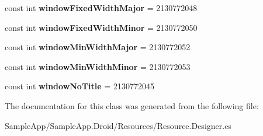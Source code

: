 \begin{DoxyCompactItemize}
const int {\bfseries window\+Fixed\+Width\+Major} = 2130772048
\item 
\mbox{\label{class_sample_app_1_1_droid_1_1_resource_1_1_attribute_adc149fd12f0a806c3bf35e2e3eb2c560}} 
const int {\bfseries window\+Fixed\+Width\+Minor} = 2130772050
\item 
\mbox{\label{class_sample_app_1_1_droid_1_1_resource_1_1_attribute_a8f9f90a1838adae18254a3d6462bdeb4}} 
const int {\bfseries window\+Min\+Width\+Major} = 2130772052
\item 
\mbox{\label{class_sample_app_1_1_droid_1_1_resource_1_1_attribute_a5f1db03cef2a5217f6031d0ef1b93bf9}} 
const int {\bfseries window\+Min\+Width\+Minor} = 2130772053
\item 
\mbox{\label{class_sample_app_1_1_droid_1_1_resource_1_1_attribute_a9b5306d9c4d297b834f1874a08119a64}} 
const int {\bfseries window\+No\+Title} = 2130772045
\end{DoxyCompactItemize}


The documentation for this class was generated from the following file\+:\begin{DoxyCompactItemize}
\item 
Sample\+App/\+Sample\+App.\+Droid/\+Resources/Resource.\+Designer.\+cs\end{DoxyCompactItemize}
